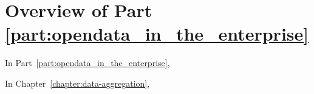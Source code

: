 \chapter*{Overview of Part \ref{part:opendata_in_the_enterprise}}

In Part~\ref{part:opendata_in_the_enterprise},

In Chapter~\ref{chapter:data-aggregation},
